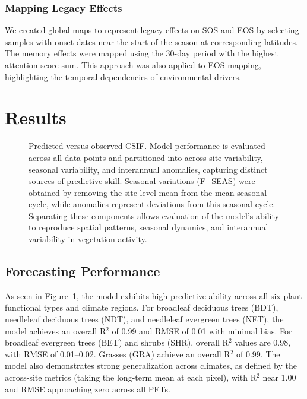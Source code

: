 \documentclass[pdflatex,sn-mathphys-num]{sn-jnl}%
\theoremstyle{thmstyleone}%
\theoremstyle{thmstyletwo}%
\theoremstyle{thmstylethree}%
\begin{document}
\subsubsection{Mapping Legacy Effects}\label{subsubsec2}
We created global maps to represent legacy effects on SOS and EOS by selecting samples with onset dates near the start of the season at corresponding latitudes. The memory effects were mapped using the 30-day period with the highest attention score sum. This approach was also applied to EOS mapping, highlighting the temporal dependencies of environmental drivers.

\section{Results}\label{sec2}

\begin{figure}[h!]
        \centering
        
        \caption{Predicted versus observed CSIF. Model performance is evaluated across all data points and partitioned into across-site variability, seasonal variability, and interannual anomalies, capturing distinct sources of predictive skill. Seasonal variations (F\_SEAS) were obtained by removing the site-level mean from the mean seasonal cycle, while anomalies represent deviations from this seasonal cycle. Separating these components allows evaluation of the model’s ability to reproduce spatial patterns, seasonal dynamics, and interannual variability in vegetation activity.}
        \label{fig:metrics}
    \end{figure}

\subsection{Forecasting Performance}\label{subsec2}

As seen in Figure~\ref{fig:metrics}, the model exhibits high predictive ability across all six plant functional types and climate regions. For broadleaf deciduous trees (BDT), needleleaf deciduous trees (NDT), and needleleaf evergreen trees (NET), the model achieves an overall R$^2$ of 0.99 and RMSE of 0.01 with minimal bias. For broadleaf evergreen trees (BET) and shrubs (SHR), overall R$^2$ values are 0.98, with RMSE of 0.01--0.02. Grasses (GRA) achieve an overall R$^2$ of 0.99. The model also demonstrates strong generalization across climates, as defined by the across-site metrics (taking the long-term mean at each pixel), with R$^2$ near 1.00 and RMSE approaching zero across all PFTs.
\end{document}
